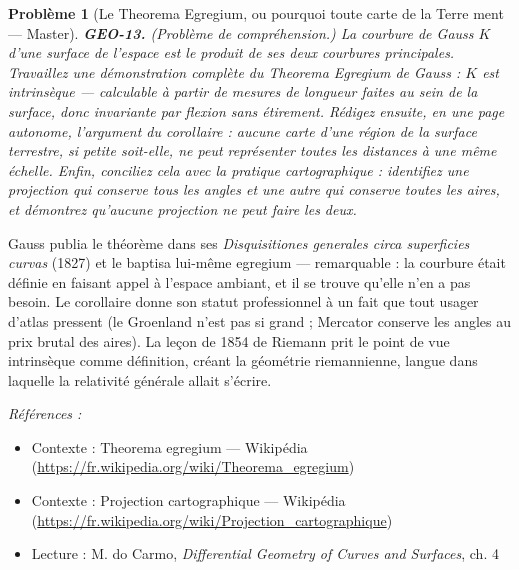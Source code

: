\documentclass[11pt]{article}
\newtheorem{problem}{Problème}
\newenvironment{refs}{\par\small\noindent\emph{Références :}\begin{itemize}\setlength\itemsep{0pt}}{\end{itemize}\normalsize}
\begin{document}
\begin{problem}[{Le Theorema Egregium, ou pourquoi toute carte de la Terre ment --- Master}]
\textbf{GEO-13.} (Problème de compréhension.) La courbure de Gauss $ K $
d'une surface de l'espace est le produit de ses deux courbures principales. Travaillez une
démonstration complète du Theorema Egregium de Gauss : $ K $ est intrinsèque --- calculable à
partir de mesures de longueur faites au sein de la surface, donc invariante par flexion sans
étirement. Rédigez ensuite, en une page autonome, l'argument du corollaire : aucune carte d'une
région de la surface terrestre, si petite soit-elle, ne peut représenter toutes les distances à une
même échelle. Enfin, conciliez cela avec la pratique cartographique : identifiez une projection qui
conserve tous les angles et une autre qui conserve toutes les aires, et démontrez qu'aucune
projection ne peut faire les deux.
\end{problem}

\noindent Gauss publia le théorème dans ses \textit{Disquisitiones generales circa superficies
curvas} (1827) et le baptisa lui-même \og{} egregium \fg{} --- remarquable : la courbure était définie en
faisant appel à l'espace ambiant, et il se trouve qu'elle n'en a pas besoin. Le corollaire donne
son statut professionnel à un fait que tout usager d'atlas pressent (le Groenland n'est pas si
grand ; Mercator conserve les angles au prix brutal des aires). La leçon de 1854 de Riemann prit le
point de vue intrinsèque comme définition, créant la géométrie riemannienne, langue dans laquelle
la relativité générale allait s'écrire.

\begin{refs}
\item Contexte : Theorema egregium --- Wikipédia (\url{https://fr.wikipedia.org/wiki/Theorema_egregium})
\item Contexte : Projection cartographique --- Wikipédia (\url{https://fr.wikipedia.org/wiki/Projection_cartographique})
\item Lecture : M. do Carmo, \textit{Differential Geometry of Curves and Surfaces}, ch. 4
\end{refs}

\bigskip
\end{document}

